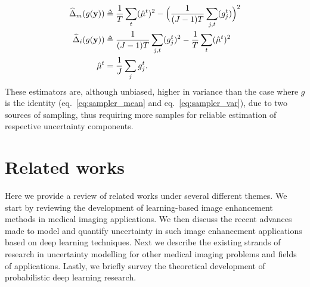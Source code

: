 \begin{align}
\widehat{\Delta}_{m}(g(\mathbf{y}))  &\delequal \frac{1}{T}\sum_{t}(\hat{\mu}^{t})^2  - \Big{(}\frac{1}{(J-1)T}\sum_{j,t}(g^{t}_{j}) \Big{)}^2 \label{eq:mc_model_uncertainty} \\ 
\widehat{\Delta}_{i}(g(\mathbf{y}))  &\delequal  \frac{1}{(J-1)T}\sum_{j,t}(g^{t}_{j})^2 - \frac{1}{T}\sum_{t}(\hat{\mu}^{t})^2 \label{eq:mc_intrinsic_uncertainty} \\
\hat{\mu}^{t} & = \frac{1}{J}\sum_{j}g^{t}_{j}. 
\end{align}
These estimators are, although unbiased, higher in variance than the case where $g$ is the identity (eq.~\eqref{eq:sampler_mean} and eq.~\eqref{eq:sampler_var}), due to two sources of sampling, thus requiring more samples for reliable estimation of respective uncertainty components. 



\section{Related works}
Here we provide a review of related works under several different themes. We start by reviewing the development of learning-based image enhancement methods in medical imaging applications. We then discuss the recent advances made to model and quantify uncertainty in such image enhancement applications based on deep learning techniques. Next we describe the existing strands of research in uncertainty modelling for other medical imaging problems and fields of applications. Lastly, we briefly survey the theoretical development of probabilistic deep learning research. 

